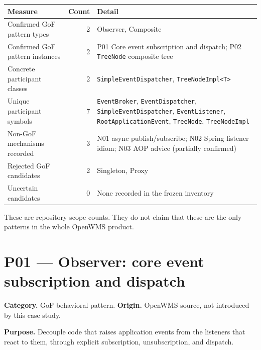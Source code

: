\documentclass[11pt,a4paper]{article}
\newcommand{\code}[1]{\nolinkurl{#1}}
\begin{document}
\begin{tabularx}{\linewidth}{@{}l r Y@{}}
\toprule
Measure & Count & Detail\\
\midrule
Confirmed GoF pattern types & 2 & Observer, Composite\\
Confirmed GoF pattern instances & 2 & P01 Core event subscription and dispatch; P02 \code{TreeNode} composite tree\\
Concrete participant classes & 2 & \code{SimpleEventDispatcher}, \code{TreeNodeImpl<T>}\\
Unique participant symbols & 7 & \code{EventBroker}, \code{EventDispatcher}, \code{SimpleEventDispatcher}, \code{EventListener}, \code{RootApplicationEvent}, \code{TreeNode}, \code{TreeNodeImpl}\\
Non-GoF mechanisms recorded & 3 & N01 async publish/subscribe; N02 Spring listener idiom; N03 AOP advice (partially confirmed)\\
Rejected GoF candidates & 2 & Singleton, Proxy\\
Uncertain candidates & 0 & None recorded in the frozen inventory\\
\bottomrule
\end{tabularx}

These are repository-scope counts. They do not claim that these are the only patterns in the whole OpenWMS product.

\section{P01 --- Observer: core event subscription and dispatch}

\textbf{Category.} GoF behavioral pattern. \textbf{Origin.} OpenWMS source, not introduced by this case study.

\textbf{Purpose.} Decouple code that raises application events from the listeners that react to them, through explicit subscription, unsubscription, and dispatch.
\end{document}

